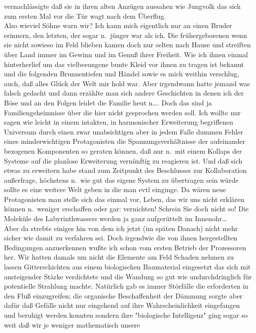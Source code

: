 \documentclass[
]{article}
\begin{document}
vernachlässigte daß sie in ihren alten Anzügen aussahen wie Jungvolk das
sich zum ersten Mal vor die Tür wagt nach dem Überflug.\\
Also wieviel Söhne warn wir? Ich kann mich eigentlich nur an einen
Bruder erinnern, den letzten, der sogar n.~jünger war als ich. Die
frühergeborenen wenn sie nicht sowieso im Feld blieben kamen doch nur
selten nach Hause und streiften über Land immer im Gewinn und im Genuß
ihrer Freiheit. Wie ich ihnen einmal hinterherlief um das vielbesungene
bunte Kleid vor ihnen zu tragen ist bekannt und die folgenden
Brunnentiefen und Händel sowie es mich weithin verschlug, auch, daß
alles Glück der Welt mir hold war. Aber irgendwann hatte jemand was
falsch gedacht und dann erzählte man sich andere Geschichten in denen
ich der Böse und an den Folgen leidet die Familie heut n\ldots. Doch das
sind ja Familiengeheimnisse über die hier nicht gesprochen werden soll.
Ich wollte nur sagen wie leicht in einem intakten, in harmonischer
Erweiterung begriffenen Universum durch einen zwar unabsichtigen aber in
jedem Falle dummen Fehler eines minderwichtigen Protagonisten die
Spannungsverhältnisse der aufeinander bezogenen Komponenten so geraten
können, daß nur n.~mit einem Kollaps der Systeme auf die planlose
Erweiterung vernünftig zu reagieren ist. Und daß sich etwas zu erweitern
habe stand zum Zeitpunkt des Beschlusses zur Kollaboration außerfrage,
höchstens n.~wie gut das eigene System zu übertragen sein würde sollte
es eine weitere Welt geben in die man evtl einginge. Da wären neue
Protagonisten man stelle sich das einmal vor, Leben, das wir uns nicht
erklären können n.~weniger erschaffen oder gar: vernichten! Schrein Sie
doch nicht so! Die Moleküle des Labyrinthwassers werden ja ganz
aufgerüttelt im Innenohr\ldots{}\\
Aber da strebte einiges hin von dem ich jetzt (im späten Danach) nicht
mehr sicher wie damit zu verfahren sei. Doch irgendwie die von ihnen
hergestellten Bedingungen anzuerkennen wußte ich schon vom ersten
Betrieb der Prozessoren her. Wir hatten damals um nicht die Elemente am
Feld Schaden nehmen zu lassen Gitterschichten aus einem biologischen
Baumaterial eingesetzt das sich mit ansteigender Stärke verdichtete und
die Wandung so gut wie undurchdringlich für potentielle Strahlung
machte. Natürlich gab es immer Störfälle die erforderten in den Fluß
einzugreifen; die organische Beschaffenheit der Dämmung sorgte aber
dafür daß Gefälle nicht nur eingehend auf ihre Wahrscheinlichkeit
eingefangen und beruhigt werden konnten sondern ihre "biologische
Intelligenz" ging sogar so weit daß wir je weniger mathematisch unsere
\end{document}
